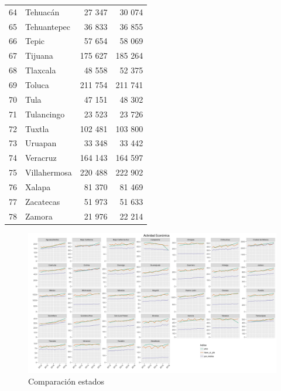 \documentclass[]{article}
\begin{document}
\begin{table}[H]
\begin{tabular}{rlrr}
  64 & Tehuacán & 27 347 & 30 074 \\ 
  65 & Tehuantepec & 36 833 & 36 855 \\ 
  66 & Tepic & 57 654 & 58 069 \\ 
  67 & Tijuana & 175 627 & 185 264 \\ 
  68 & Tlaxcala & 48 558 & 52 375 \\ 
  69 & Toluca & 211 754 & 211 741 \\ 
  70 & Tula & 47 151 & 48 302 \\ 
  71 & Tulancingo & 23 523 & 23 726 \\ 
  72 & Tuxtla & 102 481 & 103 800 \\ 
  73 & Uruapan & 33 348 & 33 442 \\ 
  74 & Veracruz & 164 143 & 164 597 \\ 
  75 & Villahermosa & 220 488 & 222 902 \\ 
  76 & Xalapa & 81 370 & 81 469 \\ 
  77 & Zacatecas & 51 973 & 51 633 \\ 
  78 & Zamora & 21 976 & 22 214 \\ 
   \hline
\end{tabular}
\endgroup
\end{table}

\begin{figure}[htbp]
\centering
\includegraphics{ficha_figs/comprobacion_modelo_35.png}
\caption{Comparación estados}
\end{figure}
\end{document}
